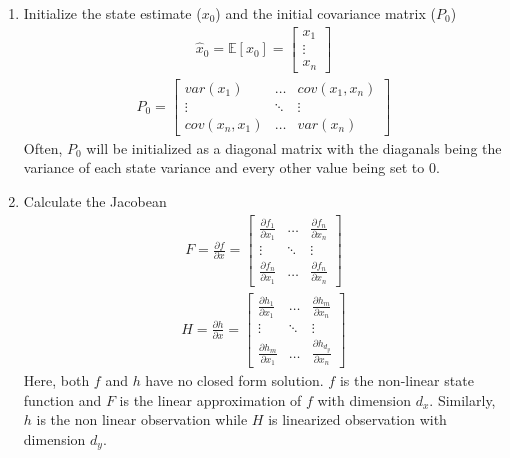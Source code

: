 \begin{enumerate}
  \item Initialize the state estimate ($x_0$) and the initial covariance matrix ($P_0$) 
  \begin{align*}
        \hat x_0 = \mathbb{E}[x_0]  = \begin{bmatrix}
           x_1 \\
           \vdots \\
           x_n 
         \end{bmatrix}  
    \end{align*}
  \begin{align*}
      P_0 =
      \begin{bmatrix}
           var(x_1)  & \hdots & cov(x_1, x_n) \\
           \vdots & \ddots & \vdots \\
           cov(x_n, x_1)  & \hdots & var(x_n )
         \end{bmatrix}  
  \end{align*}
  Often, $P_0 $ will be initialized as a diagonal matrix with the diaganals being the variance of each state variance and every other value being set to 0.
  \item Calculate the Jacobean
  \begin{align*}
      F= \frac{\partial f}{\partial x} =
      \begin{bmatrix}
           \frac{\partial f_1}{\partial x_1} & \hdots & \frac{\partial f_n}{\partial x_n} \\
           \vdots & \ddots & \vdots \\
           \frac{\partial f_n}{\partial x_1}  & \hdots & \frac{\partial f_n}{\partial x_n}
         \end{bmatrix}  
  \end{align*}
  \begin{align*}
      H = \frac{\partial h}{\partial x} =
     \begin{bmatrix}
           \frac{\partial h_1}{\partial x_1} & \hdots & \frac{\partial h_m}{\partial x_n} \\
           \vdots & \ddots & \vdots \\
           \frac{\partial h_m}{\partial x_1}  & \hdots & \frac{\partial h_{d_y}}{\partial x_n}
         \end{bmatrix}  
  \end{align*}
   Here, both $f$ and $h$ have no closed form solution. $f$ is the non-linear state function and $F$ is the linear approximation of $f$ with dimension $d_x$. Similarly, $h$ is the non linear observation while $H$ is linearized observation with dimension $d_y$. 

\end{enumerate}
